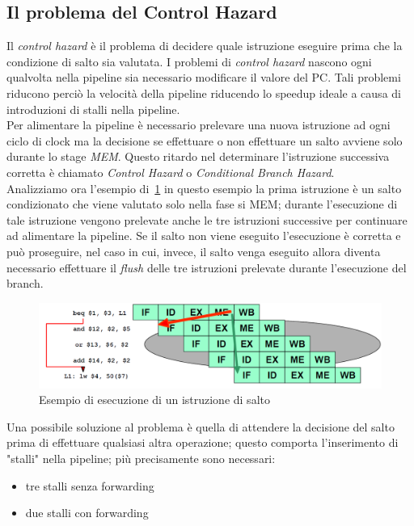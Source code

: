 \subsection{Il problema del Control Hazard}
Il \emph{control hazard} è il problema di decidere quale istruzione eseguire prima che la condizione di salto sia valutata. I problemi di \emph{control hazard} nascono ogni qualvolta nella pipeline sia necessario modificare il valore del PC. Tali problemi riducono perciò la velocità della pipeline riducendo lo speedup ideale a causa di introduzioni di stalli nella pipeline.\\
Per alimentare la pipeline è necessario prelevare una nuova istruzione ad ogni ciclo di clock ma la decisione se effettuare o non effettuare un salto avviene solo durante lo stage \emph{MEM}. Questo ritardo nel determinare l'istruzione successiva corretta è chiamato \emph{Control Hazard} o \emph{Conditional Branch Hazard}.\\
Analizziamo ora l'esempio di \figurename\,\ref{fig:branchexe} in questo esempio la prima istruzione è un salto condizionato che viene valutato solo nella fase si MEM; durante l'esecuzione di tale istruzione vengono prelevate anche le tre istruzioni successive per continuare ad alimentare la pipeline. Se il salto non viene eseguito l'esecuzione è corretta e può proseguire, nel caso in cui, invece, il salto venga eseguito allora diventa necessario effettuare il \emph{flush} delle tre istruzioni prelevate durante l'esecuzione del branch.
\begin{figure}
\centering
\includegraphics[scale=0.5]{img/branchexe.png}
\caption{Esempio di esecuzione di un istruzione di salto}\label{fig:branchexe}
\end{figure}
Una possibile soluzione al problema è quella di attendere la decisione del salto prima di effettuare qualsiasi altra operazione; questo comporta l'inserimento di "stalli" nella pipeline; più precisamente sono necessari:
\begin{itemize}
\item tre stalli senza forwarding
\item due stalli con forwarding
\end{itemize}
